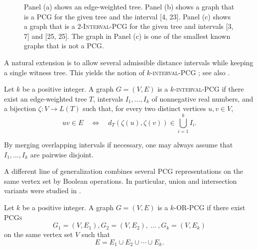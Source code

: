 \documentclass[a4paper,UKenglish,cleveref,autoref,thm-restate]{socg-lipics-v2021}
\begin{document}
\begin{figure}[t]
\begin{minipage}{0.47\textwidth}
\begin{tikzpicture}


\end{tikzpicture}
\end{minipage}

\caption{Panel (a) shows an edge-weighted tree. Panel (b) shows a graph that is a PCG for the given tree and the interval [4, 23]. Panel (c) shows a graph that is a \textsc{$2$-Interval-\textsc{PCG}} for the given tree and intervals [3, 7] and [25, 25]. The graph in Panel (c) is one of the smallest known graphs that is not a PCG. \cite{ Azam2020AMFAN, Calamoneri2022AllGWAA}}
\label{fig:pcg-2interval-overview}
\end{figure}

A natural extension is to allow several admissible distance intervals while keeping a single witness tree. This yields the notion of \textsc{$k$-interval-\textsc{PCG}} \cite{Ahmed2017MultiintervalPCAP}; see also \cite{Hayat2024AMTQ,Papan2023On2PA,Hakim2022NewROR}.

\begin{definition}
Let $k$ be a positive integer. A graph $G=(V,E)$ is a \textsc{$k$-interval-\textsc{PCG}} if there exist an edge-weighted tree $T$, intervals
\(
I_1,\dots,I_k
\)
of nonnegative real numbers, and a bijection
\(
\zeta:V\to L(T)
\)
such that, for every two distinct vertices $u,v\in V$,
\[
uv\in E
\quad\Longleftrightarrow\quad
d_T(\zeta(u),\zeta(v))\in \bigcup_{i=1}^k I_i.
\]
\end{definition}


By merging overlapping intervals if necessary, one may always assume that $I_1,\dots,I_k$ are pairwise disjoint.

A different line of generalization combines several \textsc{PCG} representations on the same vertex set by Boolean operations. In particular, union and intersection variants were studied in \cite{Calamoneri2021OnGOI,survey}.

\begin{definition}
Let $k$ be a positive integer. A graph $G=(V,E)$ is a \textsc{$k$-\textsc{OR}-\textsc{PCG}} if there exist \textsc{PCGs}
\[
G_1=(V,E_1),G_2=(V,E_2),\ \dots\ ,G_k=(V,E_k)
\]
on the same vertex set $V$ such that
\[
E=E_1\cup E_2\cup\cdots\cup E_k.
\]
\end{definition}
\end{document}
